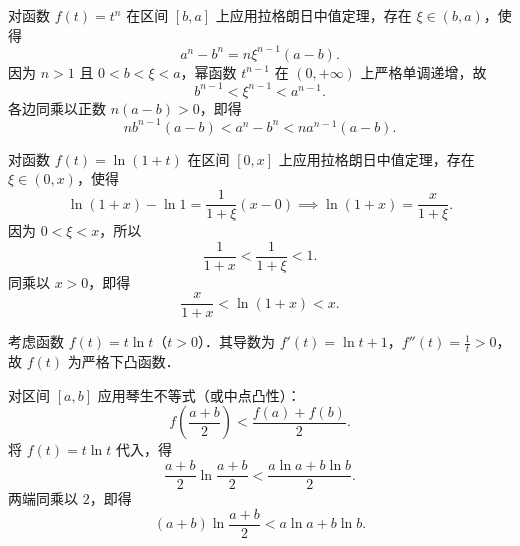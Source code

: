 \begin{myproof}

    对函数 $f(t) = t^n$ 在区间 $[b, a]$ 上应用拉格朗日中值定理，存在 $\xi \in (b, a)$，使得
    \begin{equation}
        a^n - b^n = n \xi^{n-1}(a - b).
    \end{equation}
    因为 $n > 1$ 且 $0 < b < \xi < a$，幂函数 $t^{n-1}$ 在 $(0, +\infty)$ 上严格单调递增，故
    \begin{equation}
        b^{n-1} < \xi^{n-1} < a^{n-1}.
    \end{equation}
    各边同乘以正数 $n(a - b) > 0$，即得
    \begin{equation}
        n b^{n-1}(a - b) < a^n - b^n < n a^{n-1}(a - b).
    \end{equation}


    对函数 $f(t) = \ln(1 + t)$ 在区间 $[0, x]$ 上应用拉格朗日中值定理，存在 $\xi \in (0, x)$，使得
    \begin{equation}
        \ln(1 + x) - \ln 1 = \frac{1}{1 + \xi} (x - 0) \implies \ln(1 + x) = \frac{x}{1 + \xi}.
    \end{equation}
    因为 $0 < \xi < x$，所以
    \begin{equation}
        \frac{1}{1 + x} < \frac{1}{1 + \xi} < 1.
    \end{equation}
    同乘以 $x > 0$，即得
    \begin{equation}
        \frac{x}{1 + x} < \ln(1 + x) < x.
    \end{equation}


    考虑函数 $f(t) = t\ln t$（$t > 0$）．其导数为 $f'(t) = \ln t + 1$，$f''(t) = \frac{1}{t} > 0$，故 $f(t)$ 为严格下凸函数．

    对区间 $[a, b]$ 应用琴生不等式（或中点凸性）：
    \begin{equation}
        f\left( \frac{a+b}{2} \right) < \frac{f(a) + f(b)}{2}.
    \end{equation}
    将 $f(t) = t\ln t$ 代入，得
    \begin{equation}
        \frac{a+b}{2} \ln \frac{a+b}{2} < \frac{a\ln a + b\ln b}{2}.
    \end{equation}
    两端同乘以 $2$，即得
    \begin{equation}
        (a+b)\ln \frac{a+b}{2} < a\ln a + b\ln b.
    \end{equation}



\end{myproof}
